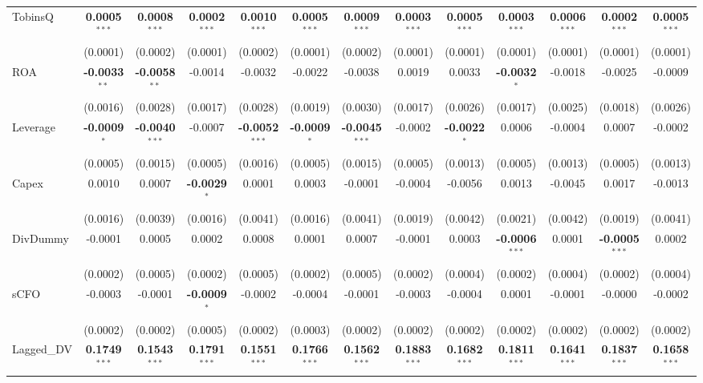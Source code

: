 \begin{landscape}
\begin{table}[H]
\begin{tabular}{lcccccccccccc}
TobinsQ & \textbf{0.0005}$^{***}$ & \textbf{0.0008}$^{***}$ & \textbf{0.0002}$^{***}$ & \textbf{0.0010}$^{***}$ & \textbf{0.0005}$^{***}$ & \textbf{0.0009}$^{***}$ & \textbf{0.0003}$^{***}$ & \textbf{0.0005}$^{***}$ & \textbf{0.0003}$^{***}$ & \textbf{0.0006}$^{***}$ & \textbf{0.0002}$^{***}$ & \textbf{0.0005}$^{***}$ \\
 & (0.0001) & (0.0002) & (0.0001) & (0.0002) & (0.0001) & (0.0002) & (0.0001) & (0.0001) & (0.0001) & (0.0001) & (0.0001) & (0.0001) \\
ROA & \textbf{-0.0033}$^{**}$ & \textbf{-0.0058}$^{**}$ & -0.0014 & -0.0032 & -0.0022 & -0.0038 & 0.0019 & 0.0033 & \textbf{-0.0032}$^{*}$ & -0.0018 & -0.0025 & -0.0009 \\
 & (0.0016) & (0.0028) & (0.0017) & (0.0028) & (0.0019) & (0.0030) & (0.0017) & (0.0026) & (0.0017) & (0.0025) & (0.0018) & (0.0026) \\
Leverage & \textbf{-0.0009}$^{*}$ & \textbf{-0.0040}$^{***}$ & -0.0007 & \textbf{-0.0052}$^{***}$ & \textbf{-0.0009}$^{*}$ & \textbf{-0.0045}$^{***}$ & -0.0002 & \textbf{-0.0022}$^{*}$ & 0.0006 & -0.0004 & 0.0007 & -0.0002 \\
 & (0.0005) & (0.0015) & (0.0005) & (0.0016) & (0.0005) & (0.0015) & (0.0005) & (0.0013) & (0.0005) & (0.0013) & (0.0005) & (0.0013) \\
Capex & 0.0010 & 0.0007 & \textbf{-0.0029}$^{*}$ & 0.0001 & 0.0003 & -0.0001 & -0.0004 & -0.0056 & 0.0013 & -0.0045 & 0.0017 & -0.0013 \\
 & (0.0016) & (0.0039) & (0.0016) & (0.0041) & (0.0016) & (0.0041) & (0.0019) & (0.0042) & (0.0021) & (0.0042) & (0.0019) & (0.0041) \\
DivDummy & -0.0001 & 0.0005 & 0.0002 & 0.0008 & 0.0001 & 0.0007 & -0.0001 & 0.0003 & \textbf{-0.0006}$^{***}$ & 0.0001 & \textbf{-0.0005}$^{***}$ & 0.0002 \\
 & (0.0002) & (0.0005) & (0.0002) & (0.0005) & (0.0002) & (0.0005) & (0.0002) & (0.0004) & (0.0002) & (0.0004) & (0.0002) & (0.0004) \\
sCFO & -0.0003 & -0.0001 & \textbf{-0.0009}$^{*}$ & -0.0002 & -0.0004 & -0.0001 & -0.0003 & -0.0004 & 0.0001 & -0.0001 & -0.0000 & -0.0002 \\
 & (0.0002) & (0.0002) & (0.0005) & (0.0002) & (0.0003) & (0.0002) & (0.0002) & (0.0002) & (0.0002) & (0.0002) & (0.0002) & (0.0002) \\
Lagged\_DV & \textbf{0.1749}$^{***}$ & \textbf{0.1543}$^{***}$ & \textbf{0.1791}$^{***}$ & \textbf{0.1551}$^{***}$ & \textbf{0.1766}$^{***}$ & \textbf{0.1562}$^{***}$ & \textbf{0.1883}$^{***}$ & \textbf{0.1682}$^{***}$ & \textbf{0.1811}$^{***}$ & \textbf{0.1641}$^{***}$ & \textbf{0.1837}$^{***}$ & \textbf{0.1658}$^{***}$ \\

\end{tabular}
\end{table}
\end{landscape}
